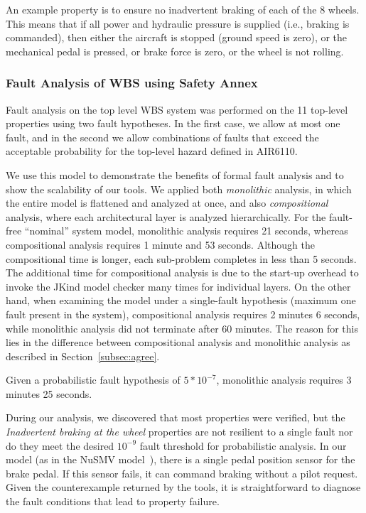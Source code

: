 An example property is to ensure no inadvertent braking of each of the 8 wheels.  This means that if all power and hydraulic pressure is supplied (i.e., braking is commanded), then either the aircraft is stopped (ground speed is zero), or the mechanical pedal is pressed, or brake force is zero, or the wheel is not rolling.


\subsubsection{Fault Analysis of WBS using Safety Annex}

Fault analysis on the top level WBS system was performed on the 11 top-level properties using two fault hypotheses.  In the first case, we allow at most one fault, and in the second we allow combinations of faults that exceed the acceptable probability for the top-level hazard defined in AIR6110.

We use this model to demonstrate the benefits of formal fault analysis and to show the scalability of our tools.  We applied both {\em monolithic} analysis, in which the entire model is flattened and analyzed at once, and also {\em compositional} analysis, where each architectural layer is analyzed hierarchically.
For the fault-free ``nominal'' system model, monolithic analysis requires 21 seconds, whereas compositional analysis requires 1 minute and 53 seconds.  Although the compositional time is longer, each sub-problem completes in less than 5 seconds.  The additional time for compositional analysis is  due to the start-up overhead to invoke the JKind model checker many times for individual layers.  On the other hand, when examining the model under a single-fault hypothesis (maximum one fault present in the system), compositional analysis requires 2 minutes 6 seconds, while monolithic analysis did not terminate after 60 minutes. The reason for this lies in the difference between compositional analysis and monolithic analysis as described in Section~\ref{subsec:agree}. 

Given a probabilistic fault hypothesis of $5*10^{-7}$, monolithic analysis requires 3 minutes 25 seconds.

During our analysis, we discovered that most properties were verified, but the \textit{Inadvertent braking at the wheel} properties are not resilient to a single fault nor do they meet the desired $10^{-9}$ fault threshold for probabilistic analysis.  In our model (as in the NuSMV model~\cite{DBLP:conf/cav/BozzanoCPJKPRT15}), there is a single pedal position sensor for the brake pedal.  If this sensor fails, it can command braking without a pilot request.  Given the counterexample returned by the tools, it is straightforward to diagnose the fault conditions that lead to property failure.

